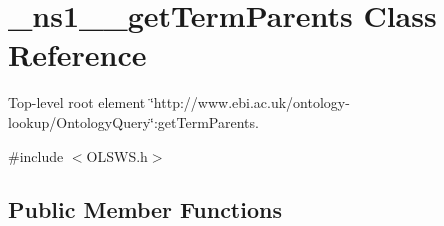 \hypertarget{class__ns1____getTermParents}{
\section{\_\-ns1\_\-\_\-getTermParents Class Reference}
\label{class__ns1____getTermParents}
}


Top-\/level root element \char`\"{}http://www.ebi.ac.uk/ontology-\/lookup/OntologyQuery\char`\"{}:getTermParents.  




{\ttfamily \#include $<$OLSWS.h$>$}

\subsection*{Public Member Functions}
